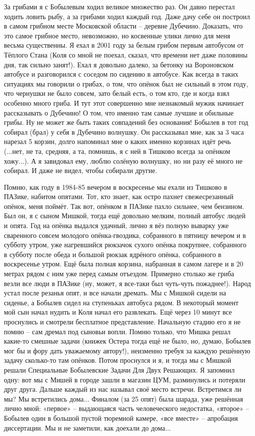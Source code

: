 За грибами я с Бобылевым ходил великое множество раз. Он давно перестал ходить ловить рыбу, а за грибами ходил каждый год.
Даже дачу себе он построил в самом грибном месте Московской области – деревне Дубечино.
Доказать, что это самое грибное место, невозможно, но косвенные улики лично для меня весьма существенны. Я ехал в 2001 году за белым грибом первым автобусом от Тёплого Стана (Коля со мной не поехал, сказал, что времени нет даже половины дня, так сильно занят!). Ехал я довольно далеко, за бетонку на Вороновском автобусе и разговорился с соседом по сидению в автобусе. Как всегда в таких ситуациях мы говорили о грибах, о том, что опёнок был не сильный в этом году, что чернушки не было совсем, зато белый есть, о том кто, где и когда взял особенно много гриба. И тут этот совершенно мне незнакомый мужик начинает рассказывать о Дубечино! О том, что именно там самые лучшие и обильные грибы. Ну не может же быть таких совпадений без основания! Бобылев в тот год собирал (брал) у себя в Дубечино волнушку. Он рассказывал мне, как за 3 часа нарезал 5 корзин, долго напоминал мне о каких именно корзинах идёт речь (...нет, не та, средняя, а та, помнишь, я с ней в Тишково всегда за опёнком хожу...). А я завидовал ему, люблю солёную волнушку, но ни разу её много не собирал. И даже не видел, чтобы собирали другие.

Помню, как году в 1984-85 вечером в воскресенье мы ехали из Тишково в ПАЗике, набитом опятами. Тот, кто знает, как остро пахнет свежесрезанный опёнок, меня поймёт. Так вот, опёнком в ПАЗике пахло сильнее, чем бензином. Был он, я с сыном Мишкой, тогда ещё довольно мелким, полный автобус людей и опята. Год на опёнка выдался удачный, лично я вёз полную выварку уже сваренного совсем молодого опёнка-гвоздика, собранного в пятницу вечером и в субботу утром, уже нагревшийся рюкзачок сухого опёнка покрупнее, собранного в субботу после обеда и большой рюкзак ядрёного опёнка, собранного в воскресенье утром. Ещё была полная корзина, набранная в самом лагере и в 20 метрах рядом с ним уже перед самым отъездом. Примерно столько же гриба везли все люди в ПАЗике (ну, может, я все-таки был чуть-чуть пожаднее!). Народ устал после резанья опят, и все начали дремать. Мы с Мишкой сидели на сиденье, а Бобылев сидел на ступеньках автобуса рядом. В некоторый момент мой сын начал нудить и Коля начал его развлекать. Ещё через 10 минут все проснулись и смотрели бесплатное представление. Начальную стадию его я не помню – сам дремал под сыновьи вопли. Помню только, что Мишка решал какие-то смешные задачи (книжек Остера тогда ещё не было, но, думаю, Бобылев мог бы и фору дать уважаемому автору!), неизменно требуя за каждую решённую задачу сколько-то там опёнков. Потом  проснулся и я, и тогда мы с Мишкой решали Специальные Бобылевские Задачи Для Двух Решающих. Я запомнил одну: вот мы с Мишей в городе зашли в магазин ЦУМ, разминулись и потеряли друг друга. Дальше каждый из нас называл своё место встречи. Встретимся ли мы? Мы встретились дома... Финалом (за 25 опят) была шарада, уже решённая лично мной: «первое» – выдающаяся часть человеческого недостатка, «второе» – Бобылев один в большой пустой тюремной камере, «все вместе» – апробация диссертации. Мы и не заметили, как доехали до дома...

